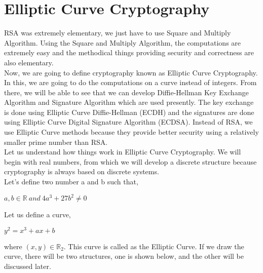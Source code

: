 \documentclass[11pt]{article}
\begin{document}
\section{Elliptic Curve Cryptography}
RSA was extremely elementary, we just have to use Square and Multiply Algorithm. Using the Square and Multiply Algorithm, the computations are extremely easy and the methodical things providing security and correctness are also elementary.\\
\newline
Now, we are going to define cryptography known as Elliptic Curve Cryptography. In this, we are going to do the computations on a curve instead of integers. From there, we will be able to see that we can develop Diffie-Hellman Key Exchange Algorithm and Signature Algorithm which are used presently. The key exchange is done using Elliptic Curve Diffie-Hellman (ECDH) and the signatures are done using Elliptic Curve Digital Signature Algorithm (ECDSA). Instead of RSA, we use Elliptic Curve methods because they provide better security using a relatively smaller prime number than RSA.\\
\newline
Let us understand how things work in Elliptic Curve Cryptography. We will begin with real numbers, from which we will develop a discrete structure because cryptography is always based on discrete systems.\\
\newline
Let's define two number a and b such that,
\begin{center}
    $a, b \in \mathbb{R} \ and \ 4a^3 + 27b^2 \neq 0$
\end{center}
Let us define a curve,
\begin{center}
    $y^2 = x^3 + ax + b$
\end{center}
where $(x,y) \in \mathbb{R}_2$. This curve is called as the Elliptic Curve. If we draw the curve, there will be two structures, one is shown below, and the other will be discussed later.
\end{document}
